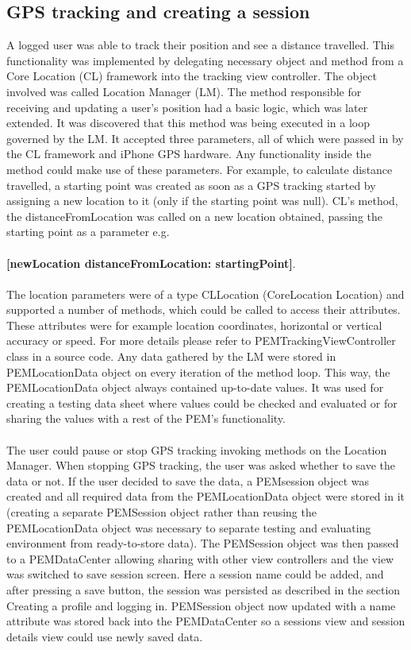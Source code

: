 \documentclass[12pt, a4paper]{report}   %
\begin{document}
\begin{enumerate}
\section{GPS tracking and creating a session}
A logged user was able to track their position and see a distance travelled. This functionality was implemented by delegating necessary object and method from a Core Location (CL) framework into the tracking view controller. The object involved was called Location Manager (LM). The method responsible for receiving and updating  a user's position had a basic logic, which was later extended. It was discovered that this method was being executed in a loop governed by the LM. It accepted three parameters, all of which were passed in by the CL framework and iPhone GPS hardware. Any functionality inside the method could make use of these parameters. For example, to calculate distance travelled, a starting point was created as soon as a GPS tracking started by assigning a new location to it (only if the starting point was null). CL's method, the distanceFromLocation was called on a new location obtained, passing the starting point as a parameter e.g.\\ \\\textbf{[newLocation distanceFromLocation: startingPoint]}.\\ \\
The location parameters were of a type CLLocation (CoreLocation Location) and supported a number of methods, which could be called to access their attributes. These attributes were for example location coordinates, horizontal or vertical accuracy or speed. For more details please refer to PEMTrackingViewController class in a source code. Any data gathered by the LM were stored in PEMLocationData object on every iteration of the method loop. This way, the PEMLocationData object always contained up-to-date values. It was used for creating a testing data sheet where values could be checked and evaluated or for sharing the values with a rest of the PEM's functionality.\\ \\
The user could pause or stop GPS tracking invoking methods on the Location Manager. When stopping GPS tracking, the user was asked whether to save the data or not. If the user decided to save the data, a PEMsession object was created and all required data from the PEMLocationData object were stored in it (creating a separate PEMSession object rather than reusing the PEMLocationData object was necessary to separate testing and evaluating environment from ready-to-store data). The PEMSession object was then passed to a PEMDataCenter allowing sharing with other view controllers and the view was switched to save session screen. Here a session name could be added, and after pressing a save button, the session was persisted as described in the section Creating a profile and logging in. PEMSession object now updated with a name attribute was stored back into the PEMDataCenter so a sessions view and session details view could use newly saved data.\\ \\

\end{enumerate}
\end{document}
